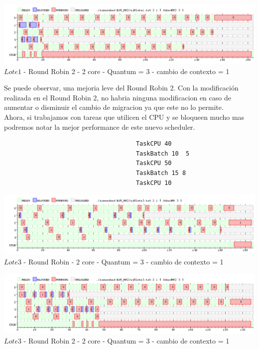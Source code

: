  \begin{center}
    	\includegraphics[width=450pt]{./EJ8_RR2/dif4corerr2.png}
	{$Lote 1$ - Round Robin 2 - 2 core - Quantum = 3 - cambio de contexto = 1}	
 \end{center}
 
 
\indent Se puede observar, una mejoria leve del Round Robin 2. Con la modificación realizada en el Round Robin 2,
no habria ninguna modificacion en caso de aumentar o disminuir el cambio de migracion ya que este no lo permite.\\

\indent Ahora, si trabajamos con tareas que utilicen el CPU y se bloqueen mucho mas podremos notar la mejor performance
de este nuevo scheduler.\\

\begin{verbatim}
                                     TaskCPU 40
                                     TaskBatch 10  5
                                     TaskCPU 50
                                     TaskBatch 15 8
                                     TaskCPU 10

\end{verbatim}


   \begin{center}
    	\includegraphics[width=450pt]{./EJ8_RR2/dif5corerr.png}
	{$Lote 3$ - Round Robin - 2 core - Quantum = 3 - cambio de contexto = 1}	
 \end{center}
 
 \begin{center}
    	\includegraphics[width=450pt]{./EJ8_RR2/dif5corerr2.png}
	{$Lote 3$ - Round Robin 2 - 2 core - Quantum = 3 - cambio de contexto = 1}	
 \end{center}

